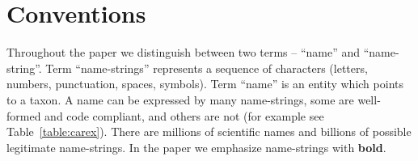 \documentclass{bmcart}
\begin{document}
\begin{frontmatter}
\begin{abstractbox}
\begin{keyword}
\end{keyword}


\end{abstractbox}
%

\end{frontmatter}



\section*{Conventions}

Throughout the paper we distinguish between two terms -- ``name'' and
``name-string''. Term ``name-strings'' represents a sequence of characters
(letters, numbers, punctuation, spaces, symbols). Term ``name'' is an entity
which points to a taxon. A name can be expressed by many name-strings, some are
well-formed and code compliant, and others are not (for example see
Table~\ref{table:carex}).  There are millions of scientific names and billions
of possible legitimate name-strings. In the paper we emphasize name-strings
with \textbf{bold}.
\end{document}

